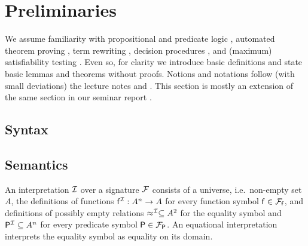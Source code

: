 
\chapter{Preliminaries}



We assume familiarity with propositional and predicate logic \cite{Huth:2004:LCS:975331}, 
automated theorem proving \cite{Fitting:1996:FLA:230183}, 
term rewriting \cite{Baader:1998:TR:280474}, 
decision procedures \cite{Kroening:2008:DPA:1391237}, 
and (maximum) satisfiability testing \cite{Biere:2009:HSV:1550723}.
Even so, for clarity we introduce basic
definitions and state basic lemmas and theorems without proofs.
Notions and notations follow (with small deviations) the lecture notes \cite{AM2015tr} and \cite{GM2013ar}.
This section is mostly an extension of the same section in our seminar report \cite{axm:SR2}.

\section{Syntax}
















\section{Semantics}

\begin{definition}
	An {\myem interpretation} ${\mathcal I}$ over a signature ${\mathcal F}$ consists 
	of a {\myem universe}, i.e.~non-empty set  $A$,
	the definitions of functions ${\mathsf f}^{\mathcal I}: A^n\rightarrow A$  for every function symbol ${\mathsf f}\in{{\mathcal F}_{\mathsf f}}$, 
	and definitions of possibly empty relations $\approx^{\mathcal I}\subseteq A^2$ for the equality symbol 
	and ${{\mathsf P}^{\mathcal I}}\subseteq A^n$ for every predicate symbol ${\mathsf P}\in{{\mathcal F}_{\mathsf P}}$.
%	
	An {\myem equational} interpretation interprets the equality symbol as equality on its domain.
\end{definition}

